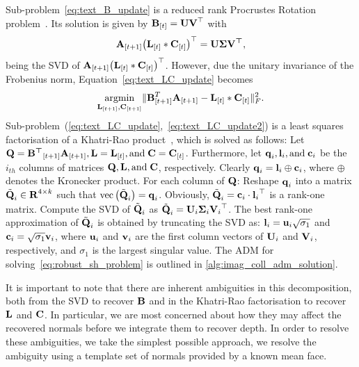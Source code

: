 { %
\newcommand{\tsub}[1]{{\bb{#1}_{[t]}}}
\newcommand{\tpsub}[1]{{\bb{#1}_{[t+1]}}}
\noindent Sub-problem~\eqref{eq:text_B_update} is a reduced rank Procrustes
Rotation problem~\cite{zou2006sparse}. Its solution is given by
$\boldsymbol{\mathbf{B}}_{[t]} = \boldsymbol{\mathbf{U}} \boldsymbol{\mathbf{V}}^{\top}$ with
\begin{equation}\label{eq:text_B_update2}
    \tpsub{A} {\left(\tsub{L} \ast \tsub{C}\right)}^{\top} = \bb{U} \bb{\Sigma} \bb{V^{\top}},
\end{equation}
being the SVD of $\tpsub{A} {\left(\tsub{L} \ast \tsub{C}\right)}^{\top}$. However, due the
unitary invariance of the Frobenius norm, Equation~\ref{eq:text_LC_update}
becomes
\begin{equation}\label{eq:text_LC_update2}
    \argmin_{\bb{L}_{[t+1]}, \bb{C}_{[t+1]}} \lVert \bb{B}_{[t+1]}^T\bb{A}_{[t+1]} - \bb{L}_{[t]} \ast \bb{C}_{[t]} \rVert_{F}^{2}.
\end{equation}
Sub-problem~(\ref{eq:text_LC_update},~\ref{eq:text_LC_update2}) is a least
squares factorisation of a Khatri-Rao product~\cite{roemer2010tensor}, which is
solved as follows:
Let $\bb{Q} = \tpsub{B^{\top}} \tpsub{A}, \bb{L} = \tsub{L}, \text{and} \; \bb{C} = \tsub{C}$.
Furthermore, let $\boldsymbol{\mathbf{q}}_i, \boldsymbol{\mathbf{l}}_i, \text{and} \; \boldsymbol{\mathbf{c}}_i$ be the $i_{th}$
columns of
matrices $\boldsymbol{\mathbf{Q}}, \boldsymbol{\mathbf{L}}, \text{and} \; \boldsymbol{\mathbf{C}}$, respectively.
Clearly $\boldsymbol{\mathbf{q}}_i = \boldsymbol{\mathbf{l}}_i \oplus \boldsymbol{\mathbf{c}}_i$, where $\oplus$ denotes the Kronecker
product. For each column of $\boldsymbol{\mathbf{Q}}$: Reshape $\boldsymbol{\mathbf{q}}_i$ into a
matrix $\tilde{\boldsymbol{\mathbf{Q}}}_i \in \boldsymbol{\mathbf{R}}^{4 \times k}$
such that
$\text{vec}\left(\tilde{\boldsymbol{\mathbf{Q}}}_i\right) = \boldsymbol{\mathbf{q}}_i$.
Obviously, $\tilde{\boldsymbol{\mathbf{Q}}}_i = \boldsymbol{\mathbf{c}}_i \cdot {\boldsymbol{\mathbf{l}}_i}^{\top}$ is a rank-one matrix.
Compute the SVD of
$\tilde{\boldsymbol{\mathbf{Q}}}_i$ as $\tilde{\boldsymbol{\mathbf{Q}}}_i = \boldsymbol{\mathbf{U}}_i \boldsymbol{\mathbf{\Sigma}}_i {\boldsymbol{\mathbf{V}}_i}^{\top}$.
The best rank-one approximation of $\tilde{\boldsymbol{\mathbf{Q}}}_i$ is obtained by truncating the SVD as:
$\boldsymbol{\mathbf{l}}_i = \boldsymbol{\mathbf{u}}_i \sqrt{\sigma_1}$ and $\boldsymbol{\mathbf{c}}_i = \sqrt{\sigma_1} \boldsymbol{\mathbf{v}}_i$,
where $\boldsymbol{\mathbf{u}}_i$ and $\boldsymbol{\mathbf{v}}_i$ are the first column vectors of $\boldsymbol{\mathbf{U}}_i$
and $\boldsymbol{\mathbf{V}}_i$, respectively, and $\sigma_1$ is the largest singular value.
The ADM for solving~\eqref{eq:robust_sh_problem} is outlined in
\cref{alg:imag_coll_adm_solution}.
}

It is important to note that there are inherent ambiguities in this
decomposition, both from the SVD to recover $\boldsymbol{\mathbf{B}}$ and in the Khatri-Rao
factorisation to recover $\boldsymbol{\mathbf{L}}$ and $\boldsymbol{\mathbf{C}}$. In particular, we are most
concerned about how they may affect the recovered normals before we integrate
them to recover depth. In order to resolve these ambiguities, we take the
simplest possible approach, we resolve the ambiguity using a template set
of normals provided by a known mean face.


